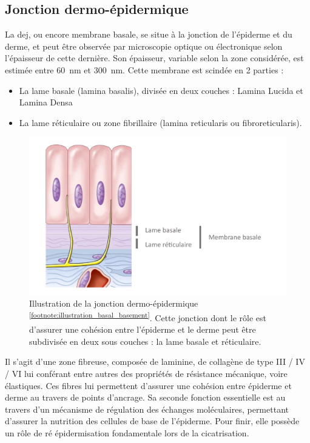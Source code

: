 \subsection{Jonction dermo-épidermique}
La \gls{dej}, ou encore membrane basale, se situe à la jonction de l’épiderme et du derme, et peut être observée par microscopie optique ou électronique selon l’épaisseur de cette dernière. Son épaisseur, variable selon la zone considérée, est estimée entre \SI{60}{\nano\metre} et \SI{300}{\nano\metre}. 
Cette membrane est scindée en 2 parties :
\begin{itemize}
\item La lame basale (lamina basalis), divisée en deux couches : Lamina Lucida et Lamina Densa
\item La lame réticulaire ou zone fibrillaire (lamina reticularis ou fibroreticularis).
\end{itemize}\par
\begin{figure}[H]
    \centering
    \includegraphics[width=\linewidth]{contents/chapter_1/resources/illustration_basal_basement.pdf}
    \caption{Illustration de la jonction dermo-épidermique \textsuperscript{\ref{footnote:illustration_basal_basement}}. Cette jonction dont le rôle est d'assurer une cohésion entre l'épiderme et le derme peut être subdivisée en deux sous couches : la lame basale et réticulaire. }
    \label{fig:illustration_basal_basement}
\end{figure}\par

\addtocounter{footnote}{1}

Il s’agit d’une zone fibreuse, composée de laminine, de collagène de type III / IV / VI lui conférant entre autres des propriétés de résistance mécanique, voire élastiques. Ces fibres lui permettent d’assurer une cohésion entre épiderme et derme au travers de points d’ancrage. Sa seconde fonction essentielle est au travers d’un mécanisme de régulation des échanges moléculaires, permettant d’assurer la nutrition des cellules de base de l’épiderme. Pour finir, elle possède un rôle de ré épidermisation fondamentale lors de la cicatrisation.\par
\clearpage

